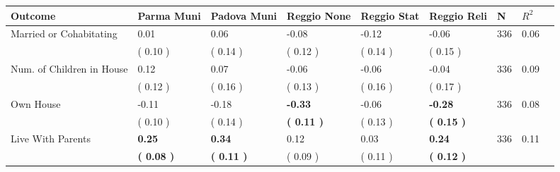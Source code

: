 \begin{tabular}{L{6.2cm} C{1.8cm} C{1.8cm} C{1.8cm} C{1.8cm} C{1.8cm} C{1.8cm} C{0.3cm} C{0.3cm}}
\toprule
 \textbf{Outcome} & \textbf{Parma Muni} & \textbf{Padova Muni} & \textbf{Reggio None} & \textbf{Reggio Stat} & \textbf{Reggio Reli} & \textbf{N} & \textbf{$ R^2$} \\
\midrule
Married or Cohabitating &      0.01 &      0.06 &     -0.08 &     -0.12 &     -0.06  & 336 &       0.06 \\ 
 & (     0.10 ) & (     0.14 ) & (     0.12 ) & (     0.14 ) & (     0.15 )  & \\
Num. of Children in House &      0.12 &      0.07 &     -0.06 &     -0.06 &     -0.04  & 336 &       0.09 \\ 
 & (     0.12 ) & (     0.16 ) & (     0.13 ) & (     0.16 ) & (     0.17 )  & \\
Own House &     -0.11 &     -0.18 & \textbf{    -0.33} &     -0.06 & \textbf{    -0.28}  & 336 &       0.08 \\ 
 & (     0.10 ) & (     0.14 ) & \textbf{(     0.11 )} & (     0.13 ) & \textbf{(     0.15 )}  & \\
Live With Parents & \textbf{     0.25} & \textbf{     0.34} &      0.12 &      0.03 & \textbf{     0.24}  & 336 &       0.11 \\ 
 & \textbf{(     0.08 )} & \textbf{(     0.11 )} & (     0.09 ) & (     0.11 ) & \textbf{(     0.12 )}  & \\
\bottomrule
\end{tabular}
